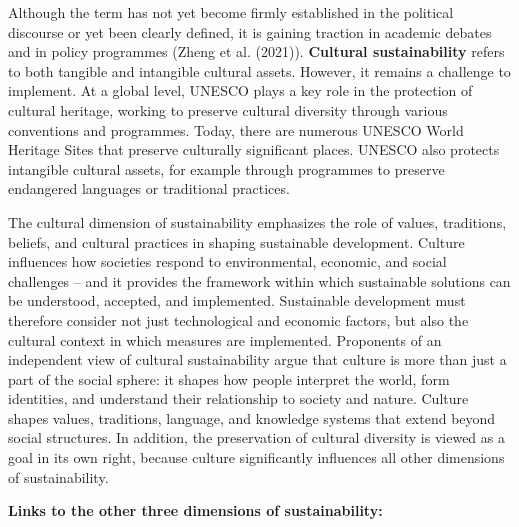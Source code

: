 \documentclass[
  a4paper,
  openany]{book}
\begin{document}
Although the term has not yet become firmly established in the political
discourse or yet been clearly defined, it is gaining traction in
academic debates and in policy programmes (Zheng et al. (2021)).
\textbf{Cultural sustainability} refers to both tangible and intangible
cultural assets. However, it remains a challenge to implement. At a
global level, UNESCO plays a key role in the protection of cultural
heritage, working to preserve cultural diversity through various
conventions and programmes. Today, there are numerous UNESCO World
Heritage Sites that preserve culturally significant places. UNESCO also
protects intangible cultural assets, for example through programmes to
preserve endangered languages or traditional practices.

The cultural dimension of sustainability emphasizes the role of values,
traditions, beliefs, and cultural practices in shaping sustainable
development. Culture influences how societies respond to environmental,
economic, and social challenges -- and it provides the framework within
which sustainable solutions can be understood, accepted, and
implemented. Sustainable development must therefore consider not just
technological and economic factors, but also the cultural context in
which measures are implemented. Proponents of an independent view of
cultural sustainability argue that culture is more than just a part of
the social sphere: it shapes how people interpret the world, form
identities, and understand their relationship to society and nature.
Culture shapes values, traditions, language, and knowledge systems that
extend beyond social structures. In addition, the preservation of
cultural diversity is viewed as a goal in its own right, because culture
significantly influences all other dimensions of sustainability.

\textbf{Links to the other three dimensions of sustainability:}
\end{document}
